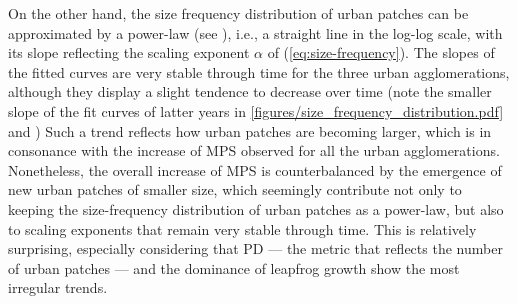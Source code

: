\documentclass[10pt,letterpaper]{article}
\begin{document}


On the other hand, the size frequency distribution of urban patches can be approximated by a power-law (see ), i.e., a straight line in the log-log scale, with its slope reflecting the scaling exponent $\alpha$ of (\ref{eq:size-frequency}). The slopes of the fitted curves are very stable through time for the three urban agglomerations, although they display a slight tendence to decrease over time (note the smaller slope of the fit curves of latter years in \autoref{figures/size_frequency_distribution.pdf} and )
Such a trend reflects how urban patches are becoming larger, which is in consonance with the increase of MPS observed for all the urban agglomerations.
Nonetheless, the overall increase of MPS is counterbalanced by the emergence of new urban patches of smaller size, which seemingly contribute not only to keeping the size-frequency distribution of urban patches as a power-law, but also to scaling exponents that remain very stable through time. This is relatively surprising, especially considering that PD --- the metric that reflects the number of urban patches --- and the dominance of leapfrog growth show the most irregular trends.
\end{document}
